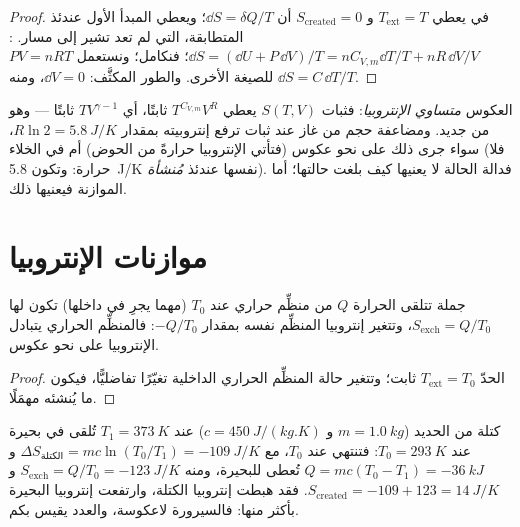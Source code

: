 \begin{proof}
في  يعطي $T_{\mathrm{ext}} = T$ و $S_{\mathrm{created}} = 0$ أن $\dd S =
\delta Q/T$؛ ويعطي المبدأ الأول عندئذ المتطابقة، التي لم تعد
تشير إلى مسار. : $\dd S = (\dd U + P\,\dd V)/T = nC_{V,m}\dd T/T
+ nR\,\dd V/V$؛ فنكامل؛ ونستعمل $PV = nRT$ للصيغة الأخرى. والطور
المكثَّف: $\dd V = 0$، ومنه $\dd S = C\,\dd T/T$.
\end{proof}

\begin{example}\label{ex:b1:second-law-entropy:formulas}
 العكوس \emph{متساوي الإنتروبيا}: فثبات $S(T, V)$
يعطي $T^{C_{V,m}}V^R$ ثابتًا، أي $TV^{\gamma - 1}$ ثابتًا ---
وهو  من جديد. ومضاعفة حجم  من غاز عند ثبات
 ترفع إنتروبيته بمقدار $R\ln2 = \qty{5.8}{J/K}$، سواء
جرى ذلك على نحو عكوس (فتأتي الإنتروبيا حرارةً من الحوض) أم  في الخلاء (فلا حرارة: وتكون \qty{5.8}{J/K} نفسها عندئذ
\emph{مُنشأة}). فدالة الحالة لا يعنيها كيف بلغت حالتها؛
أما الموازنة فيعنيها ذلك.
\end{example}

\section{موازنات الإنتروبيا}

\begin{proposition}\label{prop:b1:second-law-entropy:thermostat}
جملة تتلقى الحرارة $Q$ من منظِّم حراري عند $T_0$ (مهما يجرِ
في داخلها) تكون لها $S_{\mathrm{exch}} = Q/T_0$، وتتغير إنتروبيا
المنظِّم نفسه بمقدار $-Q/T_0$: فالمنظِّم الحراري يتبادل الإنتروبيا على نحو عكوس.
\end{proposition}

\begin{proof}
الحدّ $T_{\mathrm{ext}} = T_0$ ثابت؛ وتتغير حالة المنظِّم الحراري
الداخلية تغيّرًا تفاضليًّا، فيكون ما يُنشئه مهمَلًا.
\end{proof}

\begin{example}\label{ex:b1:second-law-entropy:quench}
كتلة من الحديد ($m = \qty{1.0}{kg}$ و $c = \qty{450}{J/(kg.K)}$) عند $T_1 =
\qty{373}{K}$ تُلقى في بحيرة عند $T_0 = \qty{293}{K}$: فتنتهي عند $T_0$،
مع $\Delta S_{\text{الكتلة}} = mc\ln(T_0/T_1) = \qty{-109}{J/K}$ و $Q =
mc(T_0 - T_1) = \qty{-36}{kJ}$ تُعطى للبحيرة، ومنه $S_{\mathrm{exch}} =
Q/T_0 = \qty{-123}{J/K}$ و $S_{\mathrm{created}} = -109 + 123 = \qty{+14}{J/K}$.
فقد هبطت إنتروبيا الكتلة، وارتفعت إنتروبيا البحيرة بأكثر منها: فالسيرورة
لاعكوسة، والعدد يقيس بكم.
\end{example}

